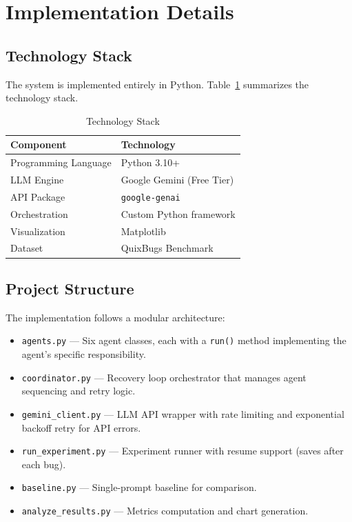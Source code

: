 \documentclass[conference]{IEEEtran}
\begin{document}
\section{Implementation Details}

\subsection{Technology Stack}
The system is implemented entirely in Python. Table~\ref{tab:techstack} summarizes the technology stack.

\begin{table}[htbp]
\caption{Technology Stack}
\label{tab:techstack}
\centering
\begin{tabular}{ll}
\toprule
\textbf{Component} & \textbf{Technology} \\
\midrule
Programming Language & Python 3.10+ \\
LLM Engine & Google Gemini (Free Tier) \\
API Package & \texttt{google-genai} \\
Orchestration & Custom Python framework \\
Visualization & Matplotlib \\
Dataset & QuixBugs Benchmark \cite{quixbugs} \\
\bottomrule
\end{tabular}
\end{table}

\subsection{Project Structure}
The implementation follows a modular architecture:
\begin{itemize}
    \item \texttt{agents.py} --- Six agent classes, each with a \texttt{run()} method implementing the agent's specific responsibility.
    \item \texttt{coordinator.py} --- Recovery loop orchestrator that manages agent sequencing and retry logic.
    \item \texttt{gemini\_client.py} --- LLM API wrapper with rate limiting and exponential backoff retry for API errors.
    \item \texttt{run\_experiment.py} --- Experiment runner with resume support (saves after each bug).
    \item \texttt{baseline.py} --- Single-prompt baseline for comparison.
    \item \texttt{analyze\_results.py} --- Metrics computation and chart generation.
\end{itemize}
\end{document}
